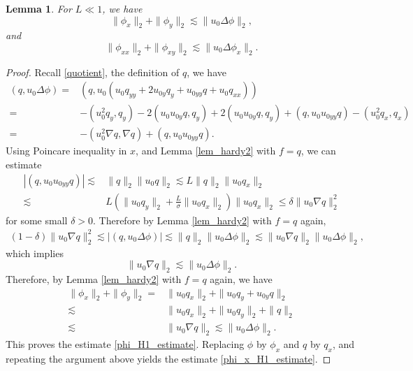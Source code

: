 \documentclass[reqno, 11pt]{amsart}
\theoremstyle{plain}
\newtheorem{lemma}[theorem]{Lemma}
\theoremstyle{definition}
\theoremstyle{remark}
\numberwithin{equation}{section}
\begin{document}
\begin{lemma}
For $L \ll 1$, we have
\begin{equation}\label{phi_H1_estimate}
\|\phi_x\|_2 + \| \phi_y\|_2  \lesssim \|u_0 \Delta \phi\|_2,
\end{equation}
and
\begin{equation}\label{phi_x_H1_estimate}
\|\phi_{xx}\|_2 + \| \phi_{xy}\|_2  \lesssim \|u_0 \Delta \phi_x\|_2.
\end{equation}
\end{lemma}
\begin{proof}
Recall \eqref{quotient}, the definition of $q$, we have
\begin{align*}
(q, u_0 \Delta \phi) =& (q, u_0(u_0 q_{yy} + 2u_{0y}q_y + u_{0yy}q + u_0 q_{xx}))\\
=& - (u_0^2 q_y, q_y) - 2(u_0 u_{0y} q, q_y) + 2(u_0 u_{0y} q, q_y) + (q, u_0 u_{0yy} q) - (u_0^2 q_x, q_x)\\
=& -(u_0^2 \nabla q, \nabla q)+ (q, u_0 u_{0yy} q).
\end{align*}
Using Poincare inequality in $x$, and Lemma \ref{lem_hardy2} with $f = q$, we can estimate
\begin{align*}
|(q, u_0 u_{0yy} q)| \lesssim& \|q\|_2 \|u_0 q\|_2 \lesssim L \|q\|_2 \|u_0 q_x\|_2\\
\lesssim& L (\|u_0 q_y\|_2 + \frac{L}{\sigma}\|u_0 q_x\|_2) \|u_0 q_x\|_2 \le \delta \|u_0 \nabla q\|_2^2
\end{align*}
for some small $\delta > 0$. Therefore by Lemma \ref{lem_hardy2} with $f = q$ again,
\begin{align*}
(1-\delta) \|u_0 \nabla q\|_2^2 \lesssim |(q, u_0 \Delta \phi)| \lesssim \|q\|_2\|u_0 \Delta \phi\|_2 \lesssim \|u_0 \nabla q\|_2\|u_0 \Delta \phi\|_2,
\end{align*}
which implies
$$
\|u_0 \nabla q\|_2 \lesssim \|u_0 \Delta \phi\|_2.
$$
Therefore, by Lemma \ref{lem_hardy2} with $f = q$ again, we have
\begin{align*}
\|\phi_x\|_2 + \| \phi_y\|_2 =& \|u_0 q_x\|_2 + \|u_0 q_y + u_{0y}q \|_2\\
\lesssim& \|u_0 q_x \|_2 + \|u_0 q_y \|_2 + \| q \|_2\\
\lesssim& \|u_0 \nabla q\|_2 \lesssim \|u_0 \Delta \phi\|_2.
\end{align*}
This proves the estimate \eqref{phi_H1_estimate}. Replacing $\phi$ by $\phi_x$ and $q$ by $q_x$, and repeating the argument above yields the estimate \eqref{phi_x_H1_estimate}.
\end{proof}
\end{document}
